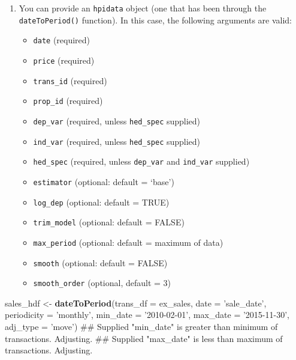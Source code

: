 \documentclass[]{article}
\newenvironment{Shaded}{\begin{snugshade}}{\end{snugshade}}
\newcommand{\DataTypeTok}[1]{\textcolor[rgb]{0.13,0.29,0.53}{#1}}
\newcommand{\KeywordTok}[1]{\textcolor[rgb]{0.13,0.29,0.53}{\textbf{#1}}}
\newcommand{\NormalTok}[1]{#1}
\newcommand{\StringTok}[1]{\textcolor[rgb]{0.31,0.60,0.02}{#1}}
\providecommand{\tightlist}{%
  \setlength{\itemsep}{0pt}\setlength{\parskip}{0pt}}
\begin{document}
\begin{enumerate}
\def\labelenumi{\arabic{enumi}.}
\setcounter{enumi}{1}
\item
  You can provide an \texttt{hpidata} object (one that has been through
  the \texttt{dateToPeriod()} function). In this case, the following
  arguments are valid:

  \begin{itemize}
  \tightlist
  \item
    \texttt{date} (required)
  \item
    \texttt{price} (required)
  \item
    \texttt{trans\_id} (required)
  \item
    \texttt{prop\_id} (required)
  \item
    \texttt{dep\_var} (required, unless \texttt{hed\_spec} supplied)
  \item
    \texttt{ind\_var} (required, unless \texttt{hed\_spec} supplied)
  \item
    \texttt{hed\_spec} (required, unless \texttt{dep\_var} and
    \texttt{ind\_var} supplied)
  \item
    \texttt{estimator} (optional: default = `base')
  \item
    \texttt{log\_dep} (optional: default = TRUE)
  \item
    \texttt{trim\_model} (optional: default = FALSE)
  \item
    \texttt{max\_period} (optional: default = maximum of data)
  \item
    \texttt{smooth} (optional: default = FALSE)
  \item
    \texttt{smooth\_order} (optional, default = 3)
  \end{itemize}
\end{enumerate}

\begin{Shaded}
\begin{Highlighting}[]
\NormalTok{  sales_hdf <-}\StringTok{ }\KeywordTok{dateToPeriod}\NormalTok{(}\DataTypeTok{trans_df =}\NormalTok{ ex_sales,}
                           \DataTypeTok{date =} \StringTok{'sale_date'}\NormalTok{,}
                           \DataTypeTok{periodicity =} \StringTok{'monthly'}\NormalTok{,}
                           \DataTypeTok{min_date =} \StringTok{'2010-02-01'}\NormalTok{,}
                           \DataTypeTok{max_date =} \StringTok{'2015-11-30'}\NormalTok{,}
                           \DataTypeTok{adj_type =} \StringTok{'move'}\NormalTok{)}
\NormalTok{## Supplied "min_date" is greater than minimum of transactions. Adjusting.}
\NormalTok{## Supplied "max_date" is less than maximum of transactions. Adjusting.}
\end{Highlighting}
\end{Shaded}
\end{document}
